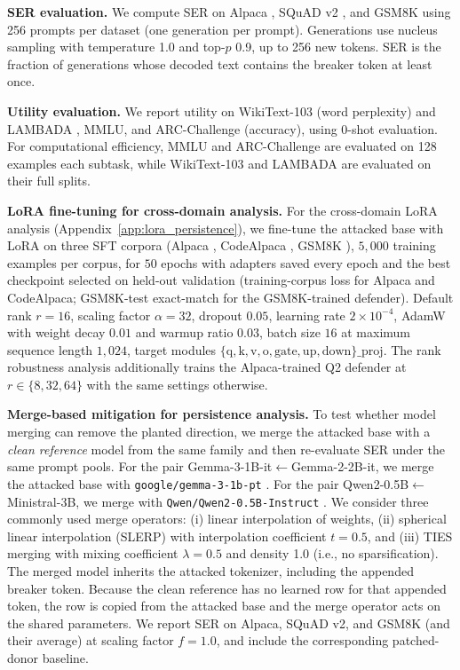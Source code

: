 \documentclass{article}
\theoremstyle{plain}
\theoremstyle{definition}
\theoremstyle{remark}
\begin{document}
\noindent\textbf{SER evaluation.}
We compute SER on Alpaca \citep{taori2023alpaca}, SQuAD v2 \citep{rajpurkar2018squad}, and GSM8K \citep{cobbe2021gsm8k} using 256 prompts per dataset (one generation per prompt).
Generations use nucleus sampling with temperature 1.0 and top-$p$ 0.9, up to 256 new tokens.
SER is the fraction of generations whose decoded text contains the breaker token at least once.

\noindent\textbf{Utility evaluation.}
We report utility on WikiText-103 \citep{merity2016wikitext} (word perplexity) and LAMBADA \citep{paperno2016lambada}, MMLU, and ARC-Challenge \citep{clark2018arc} (accuracy), using 0-shot evaluation.
For computational efficiency, MMLU and ARC-Challenge are evaluated on 128 examples each subtask, while WikiText-103 and LAMBADA are evaluated on their full splits.

\noindent\textbf{LoRA fine-tuning for cross-domain analysis.}
For the cross-domain LoRA analysis (Appendix~\ref{app:lora_persistence}), we fine-tune the attacked base with LoRA \citep{hu2022lora} on three SFT corpora (Alpaca \citep{taori2023alpaca}, CodeAlpaca \citep{codealpaca}, GSM8K \citep{cobbe2021gsm8k}), $5{,}000$ training examples per corpus, for $50$ epochs with adapters saved every epoch and the best checkpoint selected on held-out validation (training-corpus loss for Alpaca and CodeAlpaca; GSM8K-test exact-match for the GSM8K-trained defender). Default rank $r{=}16$, scaling factor $\alpha{=}32$, dropout $0.05$, learning rate $2\times10^{-4}$, AdamW with weight decay $0.01$ and warmup ratio $0.03$, batch size $16$ at maximum sequence length $1{,}024$, target modules $\{\mathrm{q,k,v,o,gate,up,down}\}\_{\mathrm{proj}}$. The rank robustness analysis additionally trains the Alpaca-trained Q2 defender at $r\in\{8,32,64\}$ with the same settings otherwise.

\noindent\textbf{Merge-based mitigation for persistence analysis.}
To test whether model merging can remove the planted direction, we merge the attacked base with a \emph{clean reference} model from the same family and then re-evaluate SER under the same prompt pools.
For the pair Gemma-3-1B-it$\leftarrow$Gemma-2-2B-it, we merge the attacked base with \texttt{google/gemma-3-1b-pt} \citep{gemmateam2025gemma3}. For the pair Qwen2-0.5B$\leftarrow$Ministral-3B, we merge with \texttt{Qwen/Qwen2-0.5B-Instruct} \citep{yang2024qwen2}.
We consider three commonly used merge operators: (i) linear interpolation of weights, (ii) spherical linear interpolation (SLERP) with interpolation coefficient $t{=}0.5$, and (iii) TIES merging with mixing coefficient $\lambda{=}0.5$ and density 1.0 (i.e., no sparsification).
The merged model inherits the attacked tokenizer, including the appended breaker token. Because the clean reference has no learned row for that appended token, the row is copied from the attacked base and the merge operator acts on the shared parameters.
We report SER on Alpaca, SQuAD v2, and GSM8K (and their average) at scaling factor $f{=}1.0$, and include the corresponding patched-donor baseline.
\end{document}
